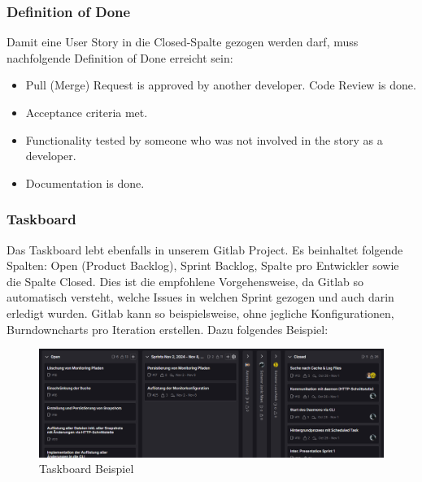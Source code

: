 \documentclass[a4paper,12pt]{report}
\begin{document}
    \subsubsection{Definition of Done}
    Damit eine User Story in die Closed-Spalte gezogen werden darf, muss nachfolgende Definition of Done erreicht sein:
    \begin{itemize}
        \item Pull (Merge) Request is approved by another developer.
        Code Review is done.
        \item Acceptance criteria met.
        \item Functionality tested by someone who was not involved in the story as a developer.
        \item Documentation is done.
    \end{itemize}

    \subsubsection{Taskboard}
    Das Taskboard lebt ebenfalls in unserem Gitlab Project.
    Es beinhaltet folgende Spalten: Open (Product Backlog), Sprint Backlog, Spalte pro Entwickler sowie die Spalte Closed.
    Dies ist die empfohlene Vorgehensweise, da Gitlab so automatisch versteht, welche Issues in welchen Sprint gezogen und auch darin erledigt wurden.
    Gitlab kann so beispielsweise, ohne jegliche Konfigurationen, Burndowncharts pro Iteration erstellen.
    Dazu folgendes Beispiel:
    \begin{figure}[h]
        \centering
        \includegraphics[width=1\textwidth]{assets/issue-board-example}
        \caption{Taskboard Beispiel}
        \label{fig:issue-board-example}
    \end{figure}
\end{document}

